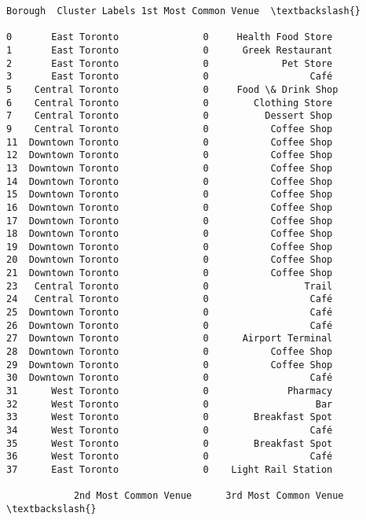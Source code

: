 \documentclass[11pt]{article}
\makeatletter
\newcommand{\boxspacing}{\kern\kvtcb@left@rule\kern\kvtcb@boxsep}
\newcommand{\prompt}[4]{
        \ttfamily\llap{{\color{#2}[#3]:\hspace{3pt}#4}}\vspace{-\baselineskip}
    }
\makeatother
\begin{document}
            \begin{tcolorbox}[breakable, size=fbox, boxrule=.5pt, pad at break*=1mm, opacityfill=0]
\prompt{Out}{outcolor}{122}{\boxspacing}
\begin{Verbatim}[commandchars=\\\{\}]
             Borough  Cluster Labels 1st Most Common Venue  \textbackslash{}

0       East Toronto               0     Health Food Store
1       East Toronto               0      Greek Restaurant
2       East Toronto               0             Pet Store
3       East Toronto               0                  Café
5    Central Toronto               0     Food \& Drink Shop
6    Central Toronto               0        Clothing Store
7    Central Toronto               0          Dessert Shop
9    Central Toronto               0           Coffee Shop
11  Downtown Toronto               0           Coffee Shop
12  Downtown Toronto               0           Coffee Shop
13  Downtown Toronto               0           Coffee Shop
14  Downtown Toronto               0           Coffee Shop
15  Downtown Toronto               0           Coffee Shop
16  Downtown Toronto               0           Coffee Shop
17  Downtown Toronto               0           Coffee Shop
18  Downtown Toronto               0           Coffee Shop
19  Downtown Toronto               0           Coffee Shop
20  Downtown Toronto               0           Coffee Shop
21  Downtown Toronto               0           Coffee Shop
23   Central Toronto               0                 Trail
24   Central Toronto               0                  Café
25  Downtown Toronto               0                  Café
26  Downtown Toronto               0                  Café
27  Downtown Toronto               0      Airport Terminal
28  Downtown Toronto               0           Coffee Shop
29  Downtown Toronto               0           Coffee Shop
30  Downtown Toronto               0                  Café
31      West Toronto               0              Pharmacy
32      West Toronto               0                   Bar
33      West Toronto               0        Breakfast Spot
34      West Toronto               0                  Café
35      West Toronto               0        Breakfast Spot
36      West Toronto               0                  Café
37      East Toronto               0    Light Rail Station

            2nd Most Common Venue      3rd Most Common Venue  \textbackslash{}


\end{Verbatim}
\end{tcolorbox}
\end{document}
